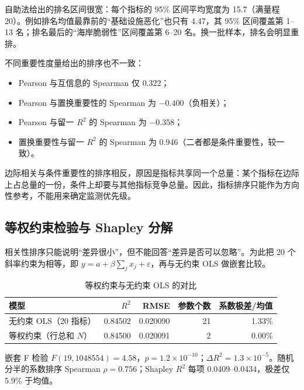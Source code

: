 \documentclass{article}
\begin{document}
自助法给出的排名区间很宽：每个指标的 95\% 区间平均宽度为 15.7（满量程 20）。例如排名均值最靠前的“基础设施恶化”也只有 4.47，其 95\% 区间覆盖第 1–13 名；排名最后的“海岸脆弱性”区间覆盖第 6–20 名。换一批样本，排名会明显重排。

不同重要性度量给出的排序也不一致：
\begin{itemize}
  \item Pearson 与互信息的 Spearman 仅 0.322；
  \item Pearson 与置换重要性的 Spearman 为 $-0.400$（负相关）；
  \item Pearson 与留一 $R^2$ 的 Spearman 为 $-0.358$；
  \item 置换重要性与留一 $R^2$ 的 Spearman 为 0.946（二者都是条件重要性，较一致）。
\end{itemize}
边际相关与条件重要性的排序相反，原因是指标共享同一个总量：某个指标在边际上占总量的一份，条件上却要与其他指标竞争总量。因此，指标排序只能作为方向性参考，不能用来确定监测优先级。

\subsection{等权约束检验与 Shapley 分解}

相关性排序只能说明“差异很小”，但不能回答“差异是否可以忽略”。为此把 20 个斜率约束为相等，即 \(y=a+\beta\sum_j x_j+\varepsilon\)，再与无约束 OLS 做嵌套比较。

\begin{table}[htbp]
\centering
\caption{等权约束与无约束 OLS 的对比}
\label{tab:p1equal}
\small
\begin{tabular}{lrrrr}
\toprule
模型 & $R^2$ & RMSE & 参数个数 & 系数极差/均值 \\
\midrule
无约束 OLS（20 指标） & 0.84502 & 0.020090 & 21 & 1.33\% \\
等权约束（行总和 $N$） & 0.84500 & 0.020091 & 2 & 0.00\% \\
\bottomrule
\end{tabular}
\par\vspace{2pt}\footnotesize 嵌套 F 检验 $F(19,1048554)=4.58$，$p=1.2\times10^{-10}$；$\Delta R^2=1.3\times10^{-5}$。随机分半的系数排序 Spearman $\rho=0.756$；Shapley $R^2$ 每项 0.0409–0.0434，极差仅 5.9\% 于均值。
\end{table}
\end{document}
